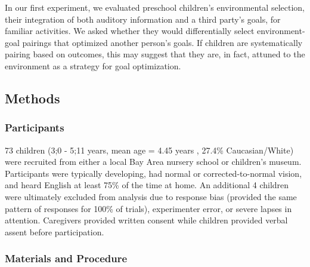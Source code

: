 \documentclass[10pt, letterpaper]{article}
\begin{document}
In our first experiment, we evaluated preschool children's environmental
selection, their integration of both auditory information and a third
party's goals, for familiar activities. We asked whether they would
differentially select environment-goal pairings that optimized another
person's goals. If children are systematically pairing based on
outcomes, this may suggest that they are, in fact, attuned to the
environment as a strategy for goal optimization.

\hypertarget{methods}{%
\subsection{Methods}\label{methods}}

\hypertarget{participants}{%
\subsubsection{Participants}\label{participants}}

73 children (3;0 - 5;11 years, mean age = 4.45 years , 27.4\%
Caucasian/White) were recruited from either a local Bay Area nursery
school or children's museum. Participants were typically developing, had
normal or corrected-to-normal vision, and heard English at least 75\% of
the time at home. An additional 4 children were ultimately excluded from
analysis due to response bias (provided the same pattern of responses
for 100\% of trials), experimenter error, or severe lapses in attention.
Caregivers provided written consent while children provided verbal
assent before participation.

\hypertarget{materials-and-procedure}{%
\subsubsection{Materials and Procedure}\label{materials-and-procedure}}
\end{document}
